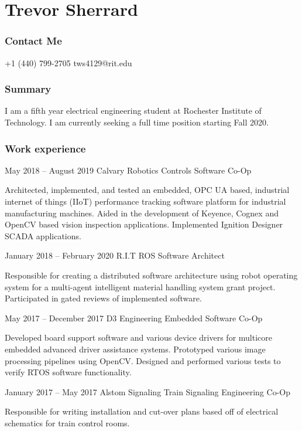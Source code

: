 \documentclass{tccv}
\begin{document}
\part{Trevor Sherrard}
\section{Contact Me}
\begin{eventlist}
    {+1 (440) 799-2705}
    {tws4129@rit.edu}
    
\end{eventlist}

\section{Summary}
I am a fifth year electrical engineering student at Rochester Institute of Technology. I am currently seeking a full time position starting Fall 2020.

\section{Work experience}

\begin{eventlist}

\item{May 2018 -- August 2019}
     {Calvary Robotics}
     {Controls Software Co-Op}

Architected, implemented, and tested an embedded, OPC UA based, industrial internet of things (IIoT) performance tracking software platform for industrial manufacturing machines. Aided in the development of Keyence, Cognex and OpenCV based vision inspection applications. Implemented Ignition Designer SCADA applications.

\item{January 2018 -- February 2020}
     {R.I.T}
     {ROS Software Architect}

Responsible for creating a distributed software architecture using robot operating system for a multi-agent intelligent material handling system grant project. Participated in gated reviews of implemented software.

\item{May 2017 -- December 2017}
     {D3 Engineering}
     {Embedded Software Co-Op}
     
Developed board support software and various device drivers for multicore embedded advanced driver assistance systems. Prototyped various image processing pipelines using OpenCV. Designed and performed various tests to verify RTOS software functionality.

\item{January 2017 -- May 2017}
     {Alstom Signaling}
     {Train Signaling Engineering Co-Op}

Responsible for writing installation and cut-over plans based off of electrical schematics for train control rooms.

\end{eventlist}
\end{document}
